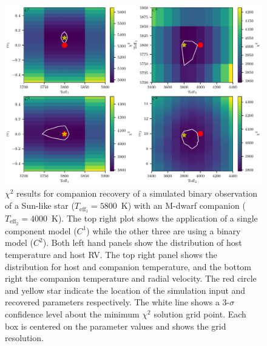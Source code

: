 \documentclass[fleqn,usenatbib]{mnras}
\begin{document}
\begin{figure}
    \centering
    \includegraphics[width=\hsize]{images/Mdwarf_pcolors.pdf}
    
    \caption{\(\chi^2\) results for companion recovery of a simulated binary observation of a Sun-like star (\(T_{\textrm{eff}_1}=5800\)~K) with an M-dwarf companion (\(T_{\textrm{eff}_2}=4000\)~K). The top right plot shows the application of a single component model (\(C^1\)) while the other three are using a binary model (\(C^2\)). Both left hand panels show the distribution of host temperature and host RV. The top right panel shows the distribution for host and companion temperature, and the bottom right the companion temperature and radial velocity.
        The red circle and yellow star indicate the location of the simulation input and recovered parameters respectively.
        The white line shows a 3-\(\sigma\) confidence level about the minimum \(\chi^2\) solution grid point. Each box is centered on the parameter values and shows the grid resolution.}
    \label{fig:Mdwarf_contours}
\end{figure}
\end{document}
